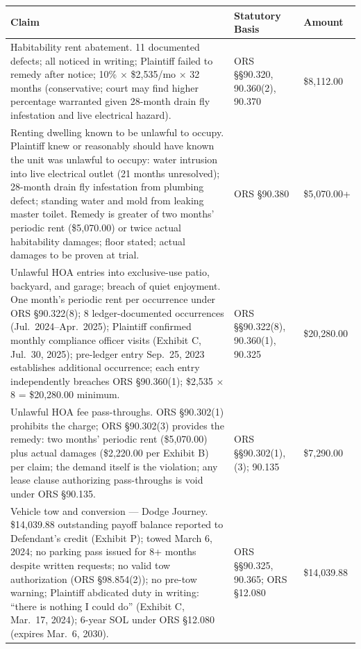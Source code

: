 \documentclass[12pt,letterpaper]{article}
\begin{document}
	\begin{singlespace}
		\noindent\begin{longtable}{|p{2.8in}|p{1.4in}|p{1.0in}|}
			\hline
			\textbf{Claim} & \textbf{Statutory Basis} & \textbf{Amount} \\
			\hline
			Habitability rent abatement. 11 documented defects; all noticed in writing; Plaintiff failed to remedy after notice; 10\% $\times$ \$2,535/mo $\times$ 32 months (conservative; court may find higher percentage warranted given 28-month drain fly infestation and live electrical hazard). & ORS \S\S90.320, 90.360(2), 90.370 & \$8,112.00 \\
			\hline
			Renting dwelling known to be unlawful to occupy. Plaintiff knew or reasonably should have known the unit was unlawful to occupy: water intrusion into live electrical outlet (21 months unresolved); 28-month drain fly infestation from plumbing defect; standing water and mold from leaking master toilet. Remedy is greater of two months' periodic rent (\$5,070.00) or twice actual habitability damages; floor stated; actual damages to be proven at trial. & ORS \S90.380 & \$5,070.00+ \\
			\hline
			Unlawful HOA entries into exclusive-use patio, backyard, and garage; breach of quiet enjoyment. One month's periodic rent per occurrence under ORS \S90.322(8); 8 ledger-documented occurrences (Jul.\ 2024--Apr.\ 2025); Plaintiff confirmed monthly compliance officer visits (Exhibit C, Jul.\ 30, 2025); pre-ledger entry Sep.\ 25, 2023 establishes additional occurrence; each entry independently breaches ORS \S90.360(1); \$2,535 $\times$ 8 = \$20,280.00 minimum. & ORS \S\S90.322(8), 90.360(1), 90.325 & \$20,280.00 \\
			\hline
			Unlawful HOA fee pass-throughs. ORS \S90.302(1) prohibits the charge; ORS \S90.302(3) provides the remedy: two months' periodic rent (\$5,070.00) plus actual damages (\$2,220.00 per Exhibit B) per claim; the demand itself is the violation; any lease clause authorizing pass-throughs is void under ORS \S90.135. & ORS \S\S90.302(1), (3); 90.135 & \$7,290.00 \\
			\hline
			Vehicle tow and conversion --- Dodge Journey. \$14,039.88 outstanding payoff balance reported to Defendant's credit (Exhibit P); towed March 6, 2024; no parking pass issued for 8+ months despite written requests; no valid tow authorization (ORS \S98.854(2)); no pre-tow warning; Plaintiff abdicated duty in writing: ``there is nothing I could do'' (Exhibit C, Mar.\ 17, 2024); 6-year SOL under ORS \S12.080 (expires Mar.\ 6, 2030). & ORS \S\S90.325, 90.365; ORS \S12.080 & \$14,039.88 \\

\end{longtable}
\end{singlespace}
\end{document}
